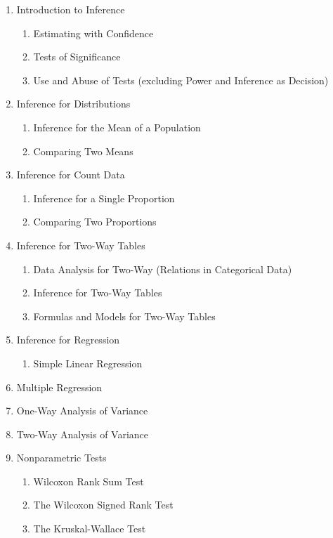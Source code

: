 \documentclass[10pt]{article}
\begin{document}
{\begin{enumerate}
\begin{enumerate}
                  \item Counts and Proportions
                  \item Sample Means
   \end{enumerate}
\item Introduction to Inference
   \begin{enumerate}
                  \item Estimating with Confidence
                  \item Tests of Significance
                  \item Use and Abuse of Tests (excluding Power and Inference as Decision)
   \end{enumerate}
\item Inference for Distributions
   \begin{enumerate}
                  \item Inference for the Mean of a Population
                  \item Comparing Two Means
   \end{enumerate}
\item Inference for Count Data
   \begin{enumerate}
                  \item Inference for a Single Proportion
                  \item Comparing Two Proportions
   \end{enumerate}
\item Inference for Two-Way Tables
   \begin{enumerate}
         \item Data Analysis for Two-Way (Relations in Categorical Data)    
         \item Inference for Two-Way Tables
         \item Formulas and Models for Two-Way Tables  
    \end{enumerate}
\item Inference for Regression
   \begin{enumerate}
                  \item Simple Linear Regression
   \end{enumerate}
\item Multiple Regression
\item One-Way Analysis of Variance
\item Two-Way Analysis of Variance
\item Nonparametric Tests
   \begin{enumerate}
                  \item Wilcoxon Rank Sum Test
                  \item The Wilcoxon Signed Rank Test
                  \item The Kruskal-Wallace Test
   \end{enumerate}
\end{enumerate}}
\end{document}
